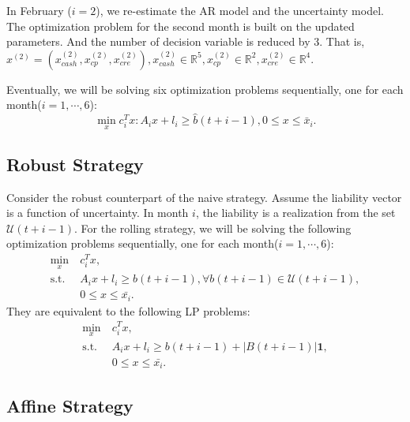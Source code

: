\documentclass{article}
\begin{document}
    In February ($i = 2$),  we re-estimate the AR model and the uncertainty model. The optimization problem for the second month is built on the updated parameters. And the number of decision variable is reduced by 3. That is, $x^{(2)}=(x^{(2)}_{cash}, x^{(2)}_{cp}, x^{(2)}_{cre}), x^{(2)}_{cash}\in\mathbb{R}^5, x^{(2)}_{cp}\in\mathbb{R}^2, x^{(2)}_{cre}\in\mathbb{R}^4$.

    Eventually, we will be solving six optimization problems sequentially, one for each month($i = 1, \cdots, 6$):
    \begin{equation}
        \min_x c_i^Tx: A_ix+l_i\geq\hat{b}(t+i-1), 0\leq x\leq \bar{x}_i.
    \end{equation}


\subsection{Robust Strategy}

    Consider the robust counterpart of the naive strategy. Assume the liability vector is a function of uncertainty. In month $i$, the liability is a realization from the set $\mathcal{U}(t+i-1)$. For the rolling strategy, we will be solving the following optimization problems sequentially, one for each month($i = 1, \cdots, 6$):
    \begin{equation}\label{eq:robust}\begin{split}
        \min_x\ & c_i^Tx,\\
        \text{s.t. }& A_ix+l_i\geq b(t+i-1), \forall b(t+i-1)\in\mathcal{U}(t+i-1) ,\\
        & 0\leq x\leq \bar{x_i}.
    \end{split}\end{equation}
    They are equivalent to the following LP problems:
    \begin{equation}\label{eq:robust_final}\begin{split}
        \min_x\ & c_i^Tx,\\
        \text{s.t. }& A_ix+l_i\geq b(t+i-1)+|B(t+i-1)|\textbf{1} ,\\
        & 0\leq x\leq \bar{x_i}.
    \end{split}\end{equation}


\subsection{Affine Strategy}
\end{document}
